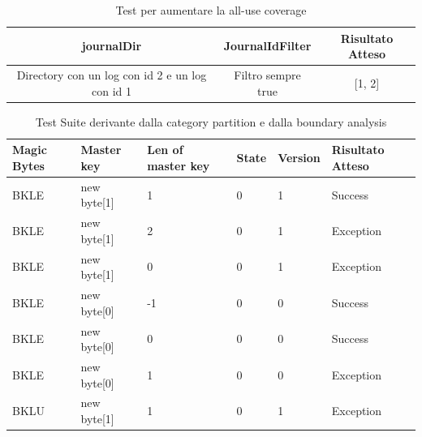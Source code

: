 \documentclass[12pt, a4paper]{article}
\begin{document}
  \begin{table}[ht]
    \centering
    \caption[Journal: Test Suite - Adequacy Data Flow 1]{Test per aumentare la all-use coverage}
    \begin{tabular}{|c|c|c|}
      \hline
      journalDir & JournalIdFilter & Risultato Atteso \\
      \hline
      {Directory con un log con id 2 e un log con id 1} & {Filtro sempre true} & [1, 2] \\
      \hline
    \end{tabular}
    \label{tab:ADF1ListJournalIds}
  \end{table}


\begin{table}[ht]
  \centering
  \caption[FileInfo: Test Suite - Category Partition]{Test Suite derivante dalla category partition e dalla boundary analysis}
  \begin{tabular}{|l|l|l|l|l|l|}
    \hline
    \textbf{Magic Bytes} & \textbf{Master key} & \textbf{Len of master key}  & \textbf{State} & \textbf{Version} & \textbf{Risultato Atteso} \\
    \hline
    BKLE & new byte[1] & 1 & 0 & 1 & Success \\
    BKLE & new byte[1] & 2 & 0 & 1 & Exception \\
    BKLE & new byte[1] & 0 & 0 & 1 & Exception \\
    BKLE & new byte[0] & -1 & 0 & 0 & Success \\
    BKLE & new byte[0] & 0 & 0 & 0 & Success \\
    BKLE & new byte[0] & 1 & 0 & 0 & Exception \\
    BKLU & new byte[1] & 1 & 0 & 1 & Exception \\
    \hline
  \end{tabular}
  \label{tab:categoryPartition1ReadHeader}
\end{table}
\end{document}
